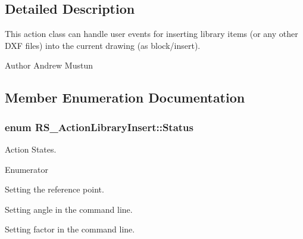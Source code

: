\subsection{Detailed Description}
This action class can handle user events for inserting library items (or any other D\-X\-F files) into the current drawing (as block/insert).

\begin{DoxyAuthor}{Author}
Andrew Mustun 
\end{DoxyAuthor}


\subsection{Member Enumeration Documentation}
\hypertarget{classRS__ActionLibraryInsert_a07bcc0d56f8cbdad359606f8af309ae7}{
\subsubsection[{Status}]{\setlength{\rightskip}{0pt plus 5cm}enum {\bf R\-S\-\_\-\-Action\-Library\-Insert\-::\-Status}}}\label{classRS__ActionLibraryInsert_a07bcc0d56f8cbdad359606f8af309ae7}
Action States. \begin{Desc}
\item[Enumerator]\par
\begin{description}
\item[{\em 
\hypertarget{classRS__ActionLibraryInsert_a07bcc0d56f8cbdad359606f8af309ae7a8048a475aa40fb6b68271c478ced8542}{Set\-Target\-Point}\label{classRS__ActionLibraryInsert_a07bcc0d56f8cbdad359606f8af309ae7a8048a475aa40fb6b68271c478ced8542}
}]Setting the reference point. \item[{\em 
\hypertarget{classRS__ActionLibraryInsert_a07bcc0d56f8cbdad359606f8af309ae7af8c6102fe82c8c7e3edd18005752851a}{Set\-Angle}\label{classRS__ActionLibraryInsert_a07bcc0d56f8cbdad359606f8af309ae7af8c6102fe82c8c7e3edd18005752851a}
}]Setting angle in the command line. \item[{\em 
\hypertarget{classRS__ActionLibraryInsert_a07bcc0d56f8cbdad359606f8af309ae7aa0937e48ee179fd9a3dedf1943002bd7}{Set\-Factor}\label{classRS__ActionLibraryInsert_a07bcc0d56f8cbdad359606f8af309ae7aa0937e48ee179fd9a3dedf1943002bd7}
}]Setting factor in the command line. \end{description}
\end{Desc}



